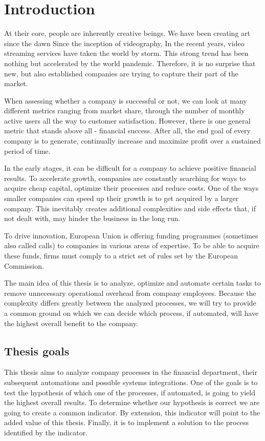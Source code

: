 \documentclass[12pt,oneside]{fithesis2}
\begin{document}
\chapter{Introduction}
At their core, people are inherently creative beings. We have been creating art since the dawn Since the inception of videography, In the recent years, video streaming services have taken the world by storm. This strong trend has been nothing but accelerated by the world pandemic. Therefore, it is no surprise that new, but also established companies are trying to capture their part of the market.
\par
When assessing whether a company is successful or not, we can look at many different metrics ranging from market share, through the number of monthly active users all the way to customer satisfaction. However, there is one general metric that stands above all - financial success. After all, the end goal of every company is to generate, continually increase and maximize profit over a sustained period of time.
\par
In the early stages, it can be difficult for a company to achieve positive financial results. To accelerate growth, companies are constantly searching for ways to acquire cheap capital, optimize their processes and reduce costs. One of the ways smaller companies can speed up their growth is to get acquired by a larger company. This inevitably creates additional complexities and side effects that, if not dealt with, may hinder the business in the long run.
\par
To drive innovation, European Union is offering funding programmes (sometimes also called calls) to companies in various areas of expertise. To be able to acquire these funds, firms must comply to a strict set of rules set by the European Commission.
\par
The main idea of this thesis is to analyze, optimize and automate certain tasks to remove unnecessary operational overhead from company employees. Because the complexity differs greatly between the analyzed processes, we will try to provide a common ground on which we can decide which process, if automated, will have the highest overall benefit to the company.
\newpage
\section{Thesis goals}
This thesis aims to analyze company processes in the financial department, their subsequent automations and possible systems integrations. One of the goals is to test the hypothesis of which one of the processes, if automated, is going to yield the highest overall results. To determine whether our hypothesis is correct we are going to create a common indicator. By extension, this indicator will point to the added value of this thesis. Finally, it is to implement a solution to the process identified by the indicator.
\end{document}
